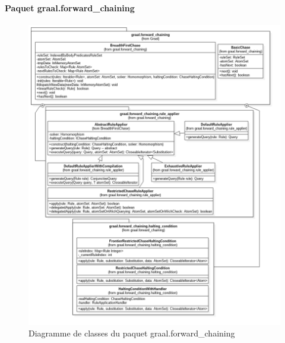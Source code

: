         \paragraph{Paquet graal.forward\_chaining}
        \begin{figure}[!h]
        \centering
        \includegraphics[width=\textwidth]{pictures/forward_chaining_class_diagram.png}
        \vspace{-30pt}
        \caption{Diagramme de classes du paquet graal.forward\_chaining}
        \label{fig:dclasse_forward_chaining}
        \end{figure}
        
